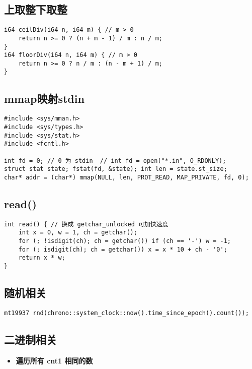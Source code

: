 \documentclass[a4paper,landscape,twocolumn]{ctexart}
\newcommand{\point}[1]{
	\begin{itemize}
		\item \textbf{#1}
	\end{itemize}
}
\begin{document}
\subsection{上取整下取整}

\begin{lstlisting}
i64 ceilDiv(i64 n, i64 m) { // m > 0
	return n >= 0 ? (n + m - 1) / m : n / m;
}
i64 floorDiv(i64 n, i64 m) { // m > 0
	return n >= 0 ? n / m : (n - m + 1) / m;
}
\end{lstlisting}

\subsection{mmap映射stdin}

\begin{lstlisting}
#include <sys/mman.h>
#include <sys/types.h>
#include <sys/stat.h>
#include <fcntl.h>

int fd = 0; // 0 为 stdin  // int fd = open("*.in", O_RDONLY);
struct stat state; fstat(fd, &state); int len = state.st_size;
char* addr = (char*) mmap(NULL, len, PROT_READ, MAP_PRIVATE, fd, 0);
\end{lstlisting}

\subsection{read()}

\begin{lstlisting}
int read() { // 换成 getchar_unlocked 可加快速度
	int x = 0, w = 1, ch = getchar();
	for (; !isdigit(ch); ch = getchar()) if (ch == '-') w = -1;
	for (; isdigit(ch); ch = getchar()) x = x * 10 + ch - '0';
	return x * w;
}
\end{lstlisting}

\subsection{随机相关}

\begin{lstlisting}
mt19937 rnd(chrono::system_clock::now().time_since_epoch().count());
\end{lstlisting}

\subsection{二进制相关}

\point{遍历所有 cnt1 相同的数}
\end{document}
